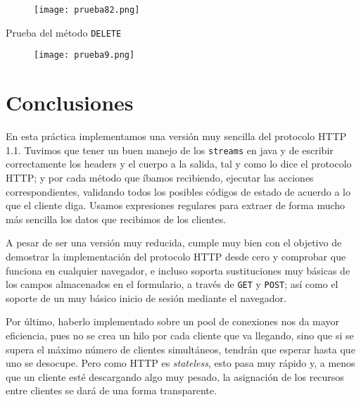 \documentclass[15pt]{article}
\begin{document}
		\begin{figure}[H]
			\centering
			\texttt{[image: prueba82.png]}
		\end{figure}
	
		\clearpage
		Prueba del método \texttt{DELETE}
		\begin{figure}[H]
			\centering
			\texttt{[image: prueba9.png]}
		\end{figure}
	
	\clearpage
	\section{Conclusiones}
		En esta práctica implementamos una versión muy sencilla del protocolo HTTP 1.1. Tuvimos que tener un buen manejo de los \texttt{streams} en java y de escribir correctamente los headers y el cuerpo a la salida, tal y como lo dice el protocolo HTTP; y por cada método que íbamos recibiendo, ejecutar las acciones correspondientes, validando todos los posibles códigos de estado de acuerdo a lo que el cliente diga. Usamos expresiones regulares para extraer de forma mucho más sencilla los datos que recibimos de los clientes.
		
		A pesar de ser una versión muy reducida, cumple muy bien con el objetivo de demostrar la implementación del protocolo HTTP desde cero y comprobar que funciona en cualquier navegador, e incluso soporta sustituciones muy básicas de los campos almacenados en el formulario, a través de \texttt{GET} y \texttt{POST}; así como el soporte de un muy básico inicio de sesión mediante el navegador.
		
		Por último, haberlo implementado sobre un pool de conexiones nos da mayor eficiencia, pues no se crea un hilo por cada cliente que va llegando, sino que si se supera el máximo número de clientes simultáneos, tendrán que esperar hasta que uno se desocupe. Pero como HTTP es \emph{stateless}, esto pasa muy rápido y, a menos que un cliente esté descargando algo muy pesado, la asignación de los recursos entre clientes se dará de una forma transparente.
	
	
\end{document}
